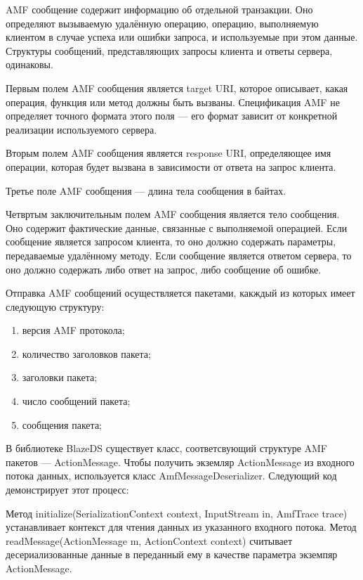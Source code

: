AMF сообщение содержит информацию об отдельной транзакции. Оно определяют вызываемую удалённую операцию, 
операцию, выполняемую клиентом в случае успеха или ошибки запроса, и используемые при этом данные. Структуры сообщений,
представляющих запросы клиента и ответы сервера, одинаковы.
 
Первым полем AMF сообщения является target URI, которое описывает, какая операция, функция или 
метод должны быть вызваны. Спецификация AMF не определяет точного формата этого поля --- его формат зависит 
от конкретной реализации используемого сервера.

Вторым полем AMF сообщения является response URI, определяющее имя операции, которая будет вызвана в зависимости от 
ответа на запрос клиента.

Третье поле AMF сообщения --- длина тела сообщения в байтах.

Четвртым заключительным полем AMF сообщения является тело сообщения. Оно содержит фактические данные, связанные 
с выполняемой операцией. Если сообщение является запросом клиента, то оно должно содержать параметры, передаваемые 
удалённому методу. Если сообщение является ответом сервера, то оно должно содержать либо ответ на запрос, либо 
сообщение об ошибке.

Отправка AMF сообщений осуществляется пакетами, какждый из которых имеет следующую структуру:

\begin{enumerate}
\item версия AMF протокола;
\item количество заголовков пакета;
\item заголовки пакета;
\item число сообщений пакета;
\item сообщения пакета;
\end{enumerate}

В библиотеке BlazeDS существует класс, соответсвующий структуре AMF пакетов --- ActionMessage. Чтобы получить экземляр 
ActionMessage из входного потока данных, используется класс AmfMessageDeserializer. Следующий код демонстрирует 
этот процесс:


 
Метод initialize(SerializationContext context, InputStream in, AmfTrace trace) устанавливает контекст для чтения данных из 
указанного входного потока. Метод readMessage(ActionMessage m, ActionContext context) считывает десериализованные данные в 
переданный ему в качестве параметра экземпяр ActionMessage.

